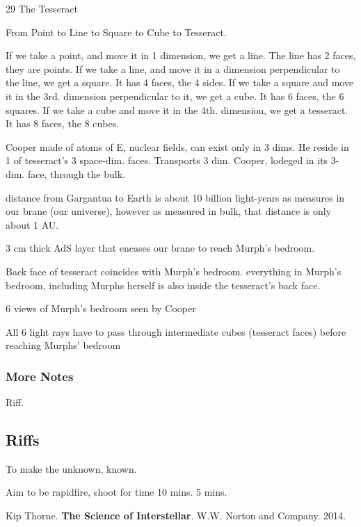 \documentclass[10pt]{amsart}
\begin{document}
29 The Tesseract

From Point to Line to Square to Cube to Tesseract.

If we take a point, and move it in 1 dimension, we get a line. The line has 2 faces, they are points.
If we take a line, and move it in a dimension perpendicular to the line, we get a square. It has 4 faces, the 4 sides.
If we take a square and move it in the 3rd. dimension perpendicular to it, we get a cube. It has 6 faces, the 6 squares.
If we take a cube and move it in the 4th. dimension, we get a tesseract. It has 8 faces, the 8 cubes.

Cooper made of atoms of E, nuclear fields, can exist only in 3 dims. He reside in 1 of tesseract's 3 space-dim. faces.
Transports 3 dim. Cooper, lodeged in its 3-dim. face, through the bulk.

distance from Gargantua to Earth is about 10 billion light-years as measures in our brane (our universe), however as measured in bulk, that distance is only about 1 AU.

3 cm thick AdS layer that encases our brane to reach Murph's bedroom.

Back face of tesseract coincides with Murph's bedroom.
everything in Murph's bedroom, including Murphs herself is also inside the tesseract's back face.

6 views of Murph's bedroom seen by Cooper

All 6 light rays have to pass through intermediate cubes (tesseract faces) before reaching Murphs' bedroom




\subsubsection{More Notes}

Riff.


\subsection{Riffs}

To make the unknown, known.

Aim to be rapidfire, shoot for time 10 mins. 5 mins.

\begin{thebibliography}{9}

Kip Thorne. \textbf{The Science of Interstellar}. W.W. Norton and Company. 2014.

\end{thebibliography}
\end{document}
